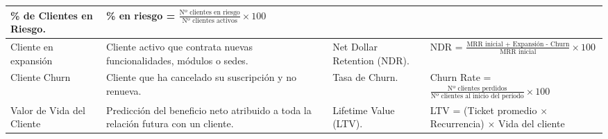 \begin{appendixd}
\begin{table}[H]
\begin{threeparttable}
\begin{tabular}{|l|C{3.5cm}|C{3.3cm}|C{5.5cm}|}
      \% de Clientes en Riesgo. &
      \% en riesgo = $\tfrac{\text{Nº clientes en riesgo}}{\text{Nº clientes activos}} \times 100$ \\
      \hline
      Cliente en expansión & Cliente activo que contrata nuevas funcionalidades, módulos o sedes. &
      Net Dollar Retention (NDR). &
      NDR = $\tfrac{\text{MRR inicial + Expansión - Churn}}{\text{MRR inicial}} \times 100$ \\
      \hline
      Cliente Churn & Cliente que ha cancelado su suscripción y no renueva. &
      Tasa de Churn. &
      Churn Rate = $\tfrac{\text{Nº clientes perdidos}}{\text{Nº clientes al inicio del período}} \times 100$ \\
      \hline
      Valor de Vida del Cliente & Predicción del beneficio neto atribuido a toda la relación futura con un cliente. &
      Lifetime Value (LTV). &
      LTV = (Ticket promedio $\times$ Recurrencia) $\times$ Vida del cliente \\
      \hline
    \end{tabular}
    \label{tab:estados-cliente}
  \end{threeparttable}
\end{table}

\end{appendixd}

